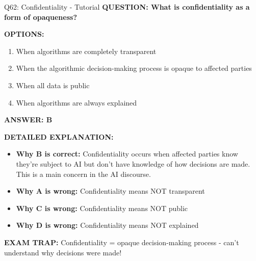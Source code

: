 \documentclass[8pt]{beamer}
\begin{document}
	\begin{frame}{Q62: Confidentiality - Tutorial}
		\fontsize{6.5}{7.5}\selectfont
		\textbf{QUESTION: What is confidentiality as a form of opaqueness?}
		
		\vspace{0.1cm}
		\textbf{OPTIONS:}
		\begin{enumerate}
			\item When algorithms are completely transparent
			\item When the algorithmic decision-making process is opaque to affected parties
			\item When all data is public
			\item When algorithms are always explained
		\end{enumerate}
		
		\vspace{0.1cm}
		\textcolor{myblue}{\textbf{ANSWER: B}}
		
		\vspace{0.1cm}
		\textbf{DETAILED EXPLANATION:}
		\begin{itemize}
			\item \textbf{Why B is correct:} Confidentiality occurs when affected parties know they're subject to AI but don't have knowledge of how decisions are made. This is a main concern in the AI discourse.
			\item \textbf{Why A is wrong:} Confidentiality means NOT transparent
			\item \textbf{Why C is wrong:} Confidentiality means NOT public
			\item \textbf{Why D is wrong:} Confidentiality means NOT explained
		\end{itemize}
		
		\textcolor{myred}{\textbf{EXAM TRAP:}} Confidentiality = \textcolor{myblue}{opaque decision-making process} - can't understand why decisions were made!
	\end{frame}
	
\end{document}
